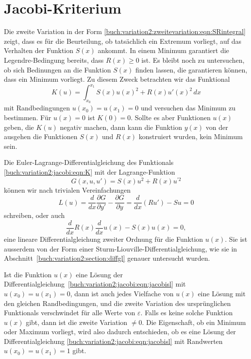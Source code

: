 %
%
%
\section{Jacobi-Kriterium
\label{buch:variation2:section:jacobi}}
Die zweite Variation in der Form
\eqref{buch:variation2:zweitevariation:eqn:SRintegral}
zeigt, dass es für die Beurteilung, ob tatsächlich ein Extremum 
vorliegt, auf das Verhalten der Funktion $S(x)$ ankommt.
In einem Minimum garantiert die Legendre-Bedingung bereits,
dass $R(x)\ge 0$ ist.
Es bleibt noch zu untersuchen, ob sich Bedinungen an die Funktion
$S(x)$ finden lassen, die garantieren können, dass ein Minimum
vorliegt.
Zu diesem Zweck betrachten wir das Funktional
\begin{equation}
K(u)
=
\int_{x_0}^{x_1}
S(x) u(x)^2 + R(x) u'(x)^2
\,dx
\label{buch:variation2:jacobi:eqn:K}
\end{equation}
mit Randbedingungen $u(x_0)=u(x_1)=0$ und versuchen das Minimum
zu bestimmen.
Für $u(x)=0$ ist $K(0)=0$.
Sollte es aber Funktionen $u(x)$ geben, die $K(u)$ negativ machen,
dann kann die Funktion $y(x)$ von der ausgehen die Funktionen $S(x)$
und $R(x)$ konstruiert wurden, kein Minimum sein.

Die Euler-Lagrange-Differentialgleichung des Funktionals
\eqref{buch:variation2:jacobi:eqn:K}
mit der Lagrange-Funk\-tion 
\[
G(x,u,u') = S(x) u^2 + R(x) u^{\prime 2}
\]
können wir nach trivialen Vereinfachungen
\[
L(u)
=
\frac{d}{dx}\frac{\partial G}{\partial y'}
-
\frac{\partial G}{\partial y}
=
\frac{d}{dx}(Ru') 
-
Su
=
0
\]
schreiben,
oder auch
\begin{equation}
\frac{d}{dx} R(x)\frac{d}{dx} u(x) - S(x) u(x) = 0,
\label{buch:variation2:jacobi:eqn:jacobisl}
\end{equation}
eine lineare Differentialgleichung zweiter Ordnung für die Funktion $u(x)$.
Sie ist ausserdem von der Form einer Sturm-Liouville-Differentialgleichung,
wie sie in Abschnitt~\ref{buch:variation2:section:diffgl} genauer
untersucht wurden.

Ist die Funktion $u(x)$ eine Lösung der
Differentialgleichung~\eqref{buch:variation2:jacobi:eqn:jacobisl}
mit $u(x_0)=u(x_1)=0$, dann ist auch jedes Vielfache von $u(x)$
eine Lösung mit den gleichen Randbedingungen, und die zweite Variation
des ursprünglichen Funktionals verschwindet für alle Werte von $\varepsilon$.
Falls es keine solche Funktion $u(x)$ gibt, dann ist die zweite
Variation $\ne 0$.
Die Eigenschaft, ob ein Minimum oder Maximum vorliegt, wird also
dadurch entschieden, ob es eine Lösung der Differentialgleichung
\eqref{buch:variation2:jacobi:eqn:jacobisl} mit
Randwerten $u(x_0)=u(x_1)=1$ gibt.

